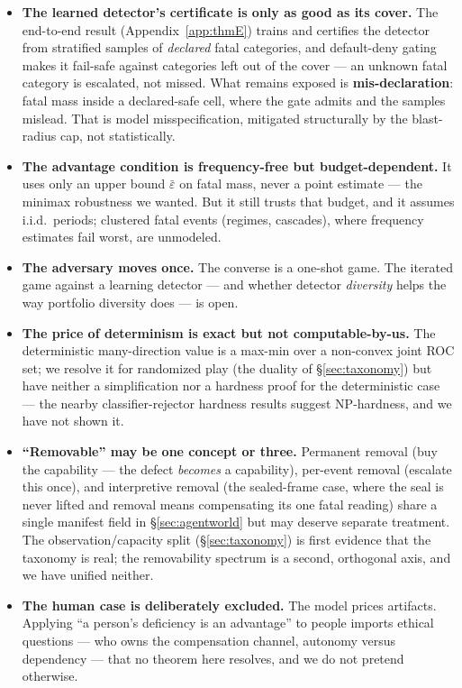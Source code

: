 \documentclass[11pt]{article}
\theoremstyle{plain}
\theoremstyle{definition}
\begin{document}
\begin{itemize}
\item \textbf{The learned detector's certificate is only as good as its cover.} The
  end-to-end result (Appendix~\ref{app:thmE}) trains and certifies the detector from
  stratified samples of \emph{declared} fatal categories, and default-deny gating
  makes it fail-safe against categories left out of the cover --- an unknown
  fatal category is escalated, not missed. What remains exposed is
  \textbf{mis-declaration}: fatal mass inside a declared-safe cell, where the gate
  admits and the samples mislead. That is model misspecification, mitigated
  structurally by the blast-radius cap, not statistically.
\item \textbf{The advantage condition is frequency-free but budget-dependent.} It uses
  only an upper bound $\bar\varepsilon$ on fatal mass, never a point estimate ---
  the minimax robustness we wanted. But it still trusts that budget, and it
  assumes i.i.d.\ periods; clustered fatal events (regimes, cascades), where
  frequency estimates fail worst, are unmodeled.
\item \textbf{The adversary moves once.} The converse is a one-shot game. The iterated
  game against a learning detector --- and whether detector \emph{diversity} helps the
  way portfolio diversity does --- is open.
\item \textbf{The price of determinism is exact but not computable-by-us.} The
  deterministic many-direction value is a max-min over a non-convex joint ROC
  set; we resolve it for randomized play (the duality of \S\ref{sec:taxonomy}) but have neither
  a simplification nor a hardness proof for the deterministic case --- the
  nearby classifier-rejector hardness results suggest NP-hardness, and we
  have not shown it.
\item \textbf{``Removable'' may be one concept or three.} Permanent removal (buy the
  capability --- the defect \emph{becomes} a capability), per-event removal (escalate
  this once), and interpretive removal (the sealed-frame case, where the seal
  is never lifted and removal means compensating its one fatal reading) share a
  single manifest field in \S\ref{sec:agentworld} but may deserve separate treatment. The
  observation/capacity split (\S\ref{sec:taxonomy}) is first evidence that the taxonomy is real;
  the removability spectrum is a second, orthogonal axis, and we have unified
  neither.
\item \textbf{The human case is deliberately excluded.} The model prices artifacts.
  Applying ``a person's deficiency is an advantage'' to people imports ethical
  questions --- who owns the compensation channel, autonomy versus dependency ---
  that no theorem here resolves, and we do not pretend otherwise.
\end{itemize}
\end{document}

